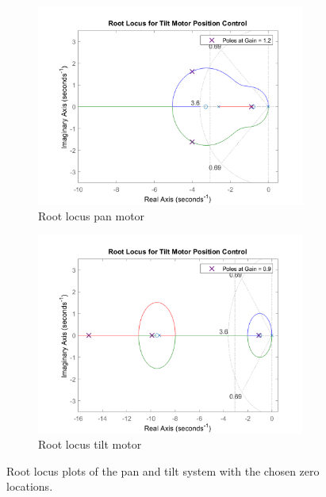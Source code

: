 \documentclass[../../main.tex]{subfiles}
\begin{document}
\begin{figure}[h]
\begin{subfigure}{0.48\textwidth}
    \includegraphics[width = 0.97\textwidth]{Sections/System_Design/Images/RL_PanMotorPos2.png}
    \caption{Root locus pan motor}
    \label{fig:PosRootLocusPan}
\end{subfigure}\quad
\begin{subfigure}{0.48\textwidth}
    \includegraphics[width = 0.97\textwidth]{Sections/System_Design/Images/RL_TiltMotorPos.png}
    \caption{Root locus tilt motor}
    \label{fig:PosRootLocusTilt}
\end{subfigure}
\caption{Root locus plots of the pan and tilt system with the chosen zero locations.}
\label{fig:PosRootLocus}
\end{figure}
\end{document}
